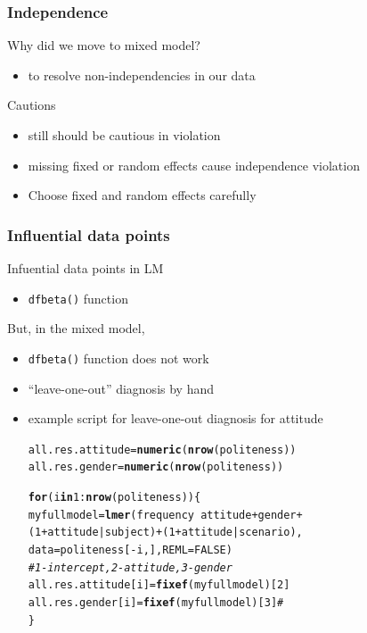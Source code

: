 \documentclass[10p]{beamer}\usepackage[]{graphicx}\usepackage[]{color}
\makeatletter
\newcommand{\hlnum}[1]{\textcolor[rgb]{0.686,0.059,0.569}{#1}}%
\newcommand{\hlcom}[1]{\textcolor[rgb]{0.678,0.584,0.686}{\textit{#1}}}%
\newcommand{\hlopt}[1]{\textcolor[rgb]{0,0,0}{#1}}%
\newcommand{\hlstd}[1]{\textcolor[rgb]{0.345,0.345,0.345}{#1}}%
\newcommand{\hlkwa}[1]{\textcolor[rgb]{0.161,0.373,0.58}{\textbf{#1}}}%
\newcommand{\hlkwb}[1]{\textcolor[rgb]{0.69,0.353,0.396}{#1}}%
\newcommand{\hlkwc}[1]{\textcolor[rgb]{0.333,0.667,0.333}{#1}}%
\newcommand{\hlkwd}[1]{\textcolor[rgb]{0.737,0.353,0.396}{\textbf{#1}}}%
\newenvironment{kframe}{%
 \def\at@end@of@kframe{}%
 \ifinner\ifhmode%
  \def\at@end@of@kframe{\end{minipage}}%
  \begin{minipage}{\columnwidth}%
 \fi\fi%
 \def\FrameCommand##1{\hskip\@totalleftmargin \hskip-\fboxsep
 \colorbox{shadecolor}{##1}\hskip-\fboxsep
     \hskip-\linewidth \hskip-\@totalleftmargin \hskip\columnwidth}%
 \MakeFramed {\advance\hsize-\width
   \@totalleftmargin\z@ \linewidth\hsize
   \@setminipage}}%
 {\par\unskip\endMakeFramed%
 \at@end@of@kframe}
\newenvironment{knitrout}{}{} %
\makeatother
\begin{document}
\begin{frame}
\frametitle{Independence}
Why did we move to mixed model?
\begin{itemize}
\item to resolve non-independencies in our data
\end{itemize}

Cautions
\begin{itemize}
\item still should be cautious in violation
\item missing fixed or random effects cause independence violation
\item Choose fixed and random effects carefully 
\end{itemize}
\end{frame}

\begin{frame}[fragile]
\frametitle{Influential data points}
Infuential data points in LM
\begin{itemize}
\item \texttt{dfbeta()} function
\end{itemize}

But, in the mixed model,
\begin{itemize}
\item \texttt{dfbeta()} function does not work
\item ``leave-one-out'' diagnosis by hand
\item example script for leave-one-out diagnosis for attitude
\begin{knitrout}\scriptsize
{}\color{fgcolor}\begin{kframe}
\begin{alltt}
\hlstd{all.res.attitude} \hlkwb{=} \hlkwd{numeric}\hlstd{(}\hlkwd{nrow}\hlstd{(politeness))}
\hlstd{all.res.gender} \hlkwb{=} \hlkwd{numeric}\hlstd{(}\hlkwd{nrow}\hlstd{(politeness))}

\hlkwa{for}\hlstd{(i} \hlkwa{in} \hlnum{1}\hlopt{:}\hlkwd{nrow}\hlstd{(politeness))\{}
  \hlstd{myfullmodel} \hlkwb{=} \hlkwd{lmer}\hlstd{(frequency} \hlopt{~} \hlstd{attitude} \hlopt{+} \hlstd{gender} \hlopt{+}
                       \hlstd{(}\hlnum{1}\hlopt{+}\hlstd{attitude}\hlopt{|}\hlstd{subject)}\hlopt{+}\hlstd{(}\hlnum{1}\hlopt{+}\hlstd{attitude}\hlopt{|}\hlstd{scenario),}
                   \hlkwc{data}\hlstd{=politeness[}\hlopt{-}\hlstd{i,],} \hlkwc{REML}\hlstd{=}\hlnum{FALSE}\hlstd{)}
  \hlcom{# 1- intercept, 2-attitude, 3-gender }
  \hlstd{all.res.attitude[i]} \hlkwb{=} \hlkwd{fixef}\hlstd{(myfullmodel)[}\hlnum{2}\hlstd{]}
  \hlstd{all.res.gender[i]} \hlkwb{=} \hlkwd{fixef}\hlstd{(myfullmodel)[}\hlnum{3}\hlstd{]} \hlcom{# }
\hlstd{\}}
\end{alltt}
\end{kframe}
\end{knitrout}
\end{itemize}
\end{frame}
\end{document}
